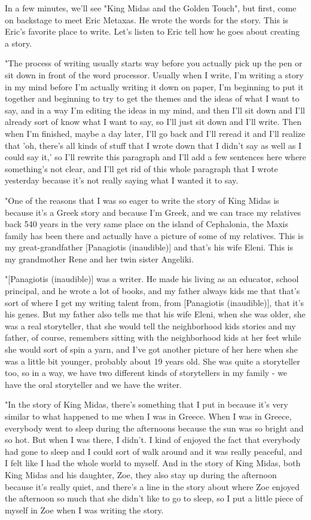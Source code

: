 In a few minutes, we'll see "King Midas and the Golden Touch", but first, come on backstage to meet Eric Metaxas. He wrote the words for the story. This is Eric's favorite place to write. Let's listen to Eric tell how he goes about creating a story.

"The process of writing usually starts way before you actually pick up the pen or sit down in front of the word processor. Usually when I write, I'm writing a story in my mind before I'm actually writing it down on paper, I'm beginning to put it together and beginning to try to get the themes and the ideas of what I want to say, and in a way I'm editing the ideas in my mind, and then I'll sit down and I'll already sort of know what I want to say, so I'll just sit down and I'll write. Then when I'm finished, maybe a day later, I'll go back and I'll reread it and I'll realize that 'oh, there's all kinds of stuff that I wrote down that I didn't say as well as I could say it,' so I'll rewrite this paragraph and I'll add a few sentences here where something's not clear, and I'll get rid of this whole paragraph that I wrote yesterday because it's not really saying what I wanted it to say.

"One of the reasons that I was so eager to write the story of King Midas is because it's a Greek story and because I'm Greek, and we can trace my relatives back 540 years in the very same place on the island of Cephalonia, the Maxis family has been there and actually have a picture of some of my relatives. This is my great-grandfather [Panagiotis (inaudible)] and that's his wife Eleni. This is my grandmother Rene and her twin sister Angeliki.

"[Panagiotis (inaudible)] was a writer. He made his living as an educator, school principal, and he wrote a lot of books, and my father always kids me that that's sort of where I get my writing talent from, from [Panagiotis (inaudible)], that it's his genes. But my father also tells me that his wife Eleni, when she was older, she was a real storyteller, that she would tell the neighborhood kids stories and my father, of course, remembers sitting with the neighborhood kids at her feet while she would sort of spin a yarn, and I've got another picture of her here when she was a little bit younger, probably about 19 years old. She was quite a storyteller too, so in a way, we have two different kinds of storytellers in my family - we have the oral storyteller and we have the writer.

"In the story of King Midas, there's something that I put in because it's very similar to what happened to me when I was in Greece. When I was in Greece, everybody went to sleep during the afternoons because the sun was so bright and so hot. But when I was there, I didn't. I kind of enjoyed the fact that everybody had gone to sleep and I could sort of walk around and it was really peaceful, and I felt like I had the whole world to myself. And in the story of King Midas, both King Midas and his daughter, Zoe, they also stay up during the afternoon because it's really quiet, and there's a line in the story about where Zoe enjoyed the afternoon so much that she didn't like to go to sleep, so I put a little piece of myself in Zoe when I was writing the story.

